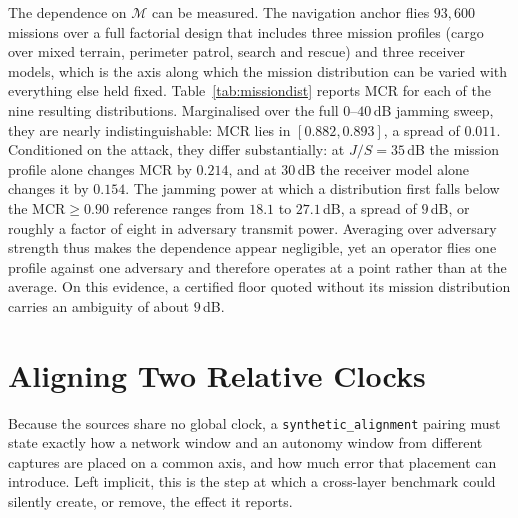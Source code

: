 \documentclass[conference,letterpaper,10pt]{IEEEtran}   %
\newcommand{\code}[1]{\texttt{#1}}
\newcommand{\MCR}{\mathrm{MCR}}
\begin{document}
The dependence on $\mathcal{M}$ can be measured. The navigation anchor flies
$93{,}600$ missions over a full factorial design that includes three mission
profiles (cargo over mixed terrain, perimeter patrol, search and rescue) and
three receiver models, which is the axis along which the mission distribution
can be varied with everything else held fixed. Table~\ref{tab:missiondist}
reports MCR for each of the nine resulting distributions. Marginalised over the
full $0$--$40$\,dB jamming sweep, they are nearly indistinguishable: MCR lies in
$[0.882,0.893]$, a spread of $0.011$. Conditioned on the attack, they differ
substantially: at $J/S=35$\,dB the mission profile alone changes MCR by
$0.214$, and at $30$\,dB the receiver model alone changes it by $0.154$. The
jamming power at which a distribution first falls below the $\MCR\ge0.90$
reference ranges from $18.1$ to $27.1$\,dB, a spread of $9$\,dB, or roughly a
factor of eight in adversary transmit power. Averaging over adversary strength
thus makes the dependence appear negligible, yet an operator flies one profile
against one adversary and therefore operates at a point rather than at the
average. On this evidence, a certified floor quoted without its mission
distribution carries an ambiguity of about $9$\,dB.

\begin{table}[t]
\centering
\caption{MCR under the composed defence for each of nine mission distributions,
marginalised over the $0$--$40$\,dB jamming sweep, with Wilson $95\%$ confidence
intervals (CIs).
The marginal spread is small; the spread conditional on attack strength
reaches $0.214$, and the $J/S$ at which MCR crosses $0.90$ spans $9$\,dB.
Provenance: simulation (physics-informed). Generated by
\code{experiments/mission\_distribution.py}.}
\label{tab:missiondist}
\scriptsize
\renewcommand{\arraystretch}{1.02}

\end{table}

\section{Aligning Two Relative Clocks}
\label{app:alignment}
Because the sources share no global clock, a \code{synthetic\_alignment} pairing
must state exactly how a network window and an autonomy window from different
captures are placed on a common axis, and how much error that placement can
introduce. Left implicit, this is the step at which a cross-layer benchmark
could silently create, or remove, the effect it reports.
\end{document}
